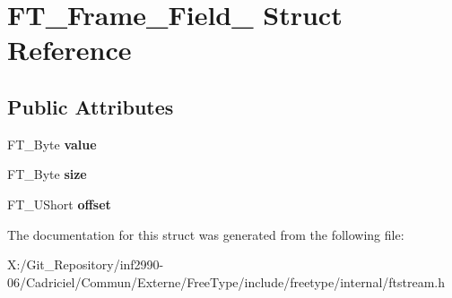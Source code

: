 \hypertarget{struct_f_t___frame___field__}{\section{F\-T\-\_\-\-Frame\-\_\-\-Field\-\_\- Struct Reference}
\label{struct_f_t___frame___field__}
}
\subsection*{Public Attributes}
\begin{DoxyCompactItemize}
\item 
\hypertarget{struct_f_t___frame___field___a10f91dcdd0a582727b67ad45d42bab41}{F\-T\-\_\-\-Byte {\bfseries value}}\label{struct_f_t___frame___field___a10f91dcdd0a582727b67ad45d42bab41}

\item 
\hypertarget{struct_f_t___frame___field___a47e6fbcb90c079421d9d9b64f63a587e}{F\-T\-\_\-\-Byte {\bfseries size}}\label{struct_f_t___frame___field___a47e6fbcb90c079421d9d9b64f63a587e}

\item 
\hypertarget{struct_f_t___frame___field___a85c3275fbb7044f7d6880020b6f0f794}{F\-T\-\_\-\-U\-Short {\bfseries offset}}\label{struct_f_t___frame___field___a85c3275fbb7044f7d6880020b6f0f794}

\end{DoxyCompactItemize}


The documentation for this struct was generated from the following file\-:\begin{DoxyCompactItemize}
\item 
X\-:/\-Git\-\_\-\-Repository/inf2990-\/06/\-Cadriciel/\-Commun/\-Externe/\-Free\-Type/include/freetype/internal/ftstream.\-h\end{DoxyCompactItemize}
